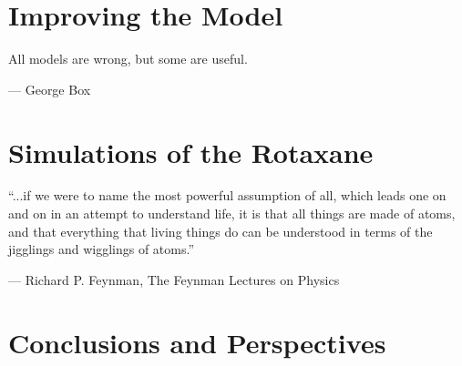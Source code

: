 \documentclass[11pt,a4paper,twoside]{vutinfth}
\newcommand*\cleartoleftpage{%
  \clearpage
  \ifodd\value{page}\hbox{}\newpage\fi
}
\newenvironment{smallfont}{\fontfamily{lmodern}\small\selectfont}{\par}
\begin{document}
\chapter{Improving the Model}
\epigraph{All models are wrong, but some are useful.}
{--- \textup{George Box}}





\chapter{Simulations of the Rotaxane}
\epigraphfontsize{\small\itshape}
\epigraph{“...if we were to name the most powerful assumption of all, which leads one on
and on in an attempt to understand life, it is that all things are made of atoms, and
that everything that living things do can be understood in terms of the jigglings and
wigglings of atoms.”}
{--- \textup{Richard P. Feynman}, The Feynman Lectures on Physics\cite{feynmanLectures}}




\chapter{Conclusions and Perspectives}




\begin{appendices}

\end{appendices}

\twocolumn
% 
\printbibliography

\onecolumn

\cleardoublepage
\thispagestyle{empty}

\cleartoleftpage{} %

\end{document}
